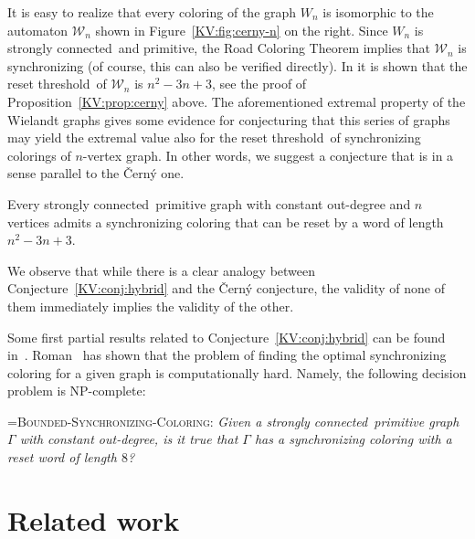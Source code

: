 \documentclass{irmaart}
\newcommand{\rt}{reset threshold}
\newcommand{\scn}{strongly connected}
\theoremstyle{plain}
\begin{document}
It is easy to realize that every coloring of the graph $W_n$ is isomorphic to
the automaton $\mathcal{W}_n$ shown in Figure~\ref{KV:fig:cerny-n} on the
right. Since $W_n$ is \scn\ and primitive, the Road Coloring Theorem implies
that $\mathcal{W}_n$ is synchronizing (of course, this can also be verified
directly). In \cite{Ananichev&Gusev&Volkov:2010} it is shown that the \rt\ of
$\mathcal{W}_n$ is $n^2-3n+3$, see the proof of Proposition~\ref{KV:prop:cerny}
above. The aforementioned extremal property of the Wielandt graphs gives some
evidence for conjecturing that this series of graphs may yield the extremal
value also for the \rt\ of synchronizing colorings of $n$-vertex graph. In
other words, we suggest a conjecture that is in a sense parallel to the
\v{C}ern\'{y} one.
\begin{conjecture}
\label{KV:conj:hybrid} Every \scn\ primitive graph with constant out-degree and $n$ vertices admits a synchronizing coloring that can be
reset by a word of length $n^2-3n+3$.
\end{conjecture}
We observe that while there is a clear analogy between
Conjecture~\ref{KV:conj:hybrid} and the \v{C}ern\'{y} conjecture, the validity
of none of them immediately implies the validity of the other.

Some first partial results related to Conjecture~\ref{KV:conj:hybrid} can be
found in~\cite{Carpi&D'Alessandro:2010,Steinberg:2011}. Roman~\cite{Roman:2011}
has shown that the problem of finding the optimal synchronizing coloring for a
given graph is computationally hard. Namely, the following decision problem
 is
\textsf{NP}-complete:

\smallskip

\hangindent=\parindent \noindent \textsc{Bounded-Synchronizing-Coloring:} \emph{Given a \scn\ primitive graph $\Gamma$ with constant
out-degree, is it true that $\Gamma$ has a synchronizing coloring with a reset word of length $8$?}

\section{Related work}
\label{KV:sec:related}


\begin{footnotesize}
  
\end{footnotesize}


\markright{\indexname}\markboth{\indexname}{\indexname}
\printindex
\end{document}
